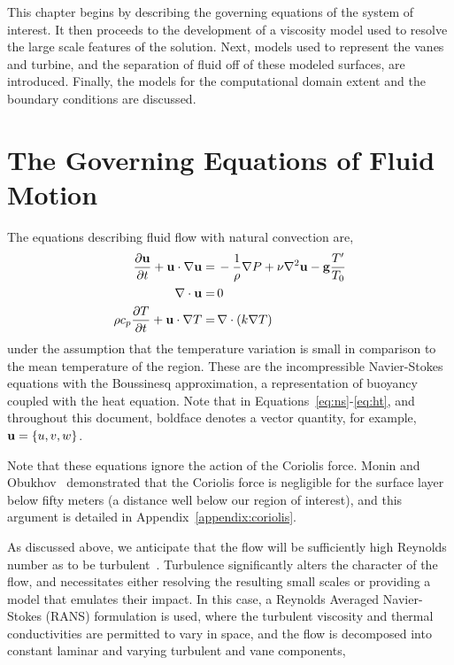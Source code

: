 This chapter begins by describing the governing equations of the system
of interest. It then proceeds to the development of a viscosity model
used to resolve the large scale features of the solution. Next, models
used to represent the vanes and turbine, and the separation of
fluid off of these modeled surfaces, are introduced.  Finally, the
models for the computational domain extent and the boundary conditions
are discussed. 


\section{The Governing Equations of Fluid Motion}
\label{sub_sec:ns_en}

The equations describing fluid flow with natural convection are,
\begin{align}
  \frac{\partial {\bf u}}{\partial t} + {\bf u} \cdot \nabla {\bf u} =& \,
  -\frac{1}{\rho}\nabla P + \nu \nabla^2 {\bf u} - {\bf g} \frac{T'}{T_0}
 \label{eq:ns} \\
  \nabla \cdot {\bf u} =& \, 0 \label{eq:cont} \\
  \rho c_p \frac{\partial T}{\partial t} + {\bf u} \cdot \nabla T =& \, \nabla
 \cdot ( k \nabla T) \label{eq:ht}
\end{align} 
under the assumption that the temperature variation is small in
comparison to the mean temperature of the region. These are the
incompressible Navier-Stokes equations with the Boussinesq
approximation\cite{boussinesq2010théorie}, a representation of buoyancy
coupled with the heat equation. Note that in
Equations~\ref{eq:ns}-\ref{eq:ht}, and throughout this document,
boldface denotes a vector quantity, for example, ${\bf u} = \{u,v,w\}$.  

Note that these equations ignore the action of the Coriolis force. 
Monin and Obukhov~\cite{monin1954basic} demonstrated that the Coriolis
force is negligible for the surface layer below fifty meters (a distance
well below our region of interest), and this argument is detailed in
Appendix~\ref{appendix:coriolis}.  

As discussed above, we anticipate that the flow will be sufficiently
high Reynolds number as to be
turbulent~\cite{Reynolds01011883}. Turbulence significantly alters the
character of the flow,  
and necessitates either resolving the resulting small scales or
providing a model that emulates their impact. In this case, a
Reynolds Averaged Navier-Stokes (RANS) formulation is used, where the 
turbulent viscosity and thermal conductivities are permitted to vary in
space, and the flow is decomposed into constant laminar and varying
turbulent and vane components,  


